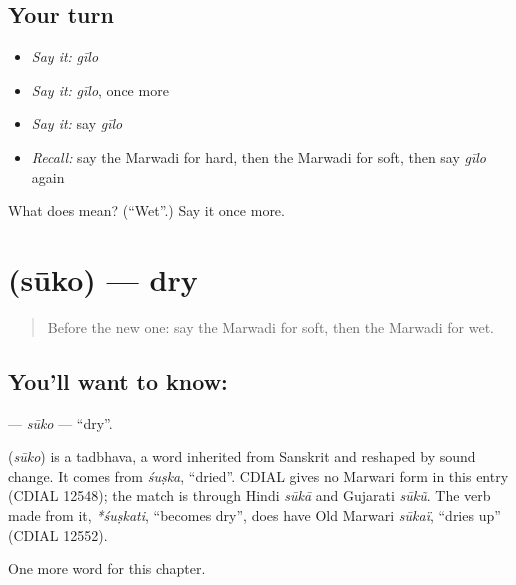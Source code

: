 \subsection*{Your turn}
\begin{itemize}
\raggedright
  \item \emph{Say it:} \emph{gīlo}
  \item \emph{Say it:} \emph{gīlo}, once more
  \item \emph{Say it:} say \emph{gīlo}
  \item \emph{Recall:} say the Marwadi for hard, then the Marwadi for soft, then say \emph{gīlo} again
\end{itemize}

\begin{tcolorbox}[breakable,colback=teal!4,colframe=teal!35!black,title={Before you move on}]
What does  mean? (\textquotedblleft{}Wet\textquotedblright{}.) Say it once more.
\end{tcolorbox}
\section[\texorpdfstring{\mw{सूको} (sūko)}{सूको (sūko)}]{ (sūko) — dry}

\label{lesson:MW-C142-suko}



\begin{quote}
Before the new one: say the Marwadi for soft, then the Marwadi for wet.
\end{quote}

\subsection*{You'll want to know: }
\textbf{} — \emph{sūko} — \textquotedblleft{}dry\textquotedblright{}.

\begin{cousinweb}
\textbf{} (\emph{sūko}) is a tadbhava, a word inherited from Sanskrit and reshaped by sound change. It comes from \emph{śuṣka}, \textquotedblleft{}dried\textquotedblright{}. CDIAL gives no Marwari form in this entry (CDIAL 12548); the match is through Hindi \emph{sūkā} and Gujarati \emph{sūkũ}. The verb made from it, \emph{*śuṣkati}, \textquotedblleft{}becomes dry\textquotedblright{}, does have Old Marwari \emph{sūkaï}, \textquotedblleft{}dries up\textquotedblright{} (CDIAL 12552).
\end{cousinweb}

\begin{grammarlens}[title={What you've built}]
One more word for this chapter.
\end{grammarlens}


